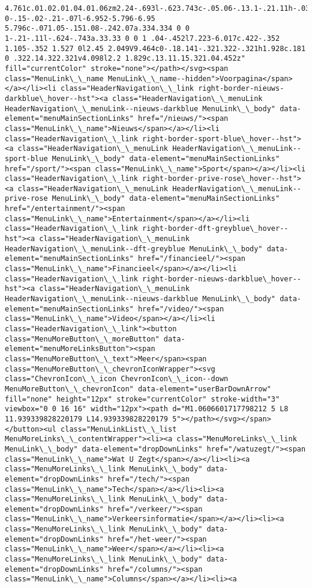 \documentclass[11pt]{article}
\begin{document}
\begin{Verbatim}[commandchars=\\\{\}]
4.761c.01.02.01.04.01.06zm2.24-.693l-.623.743c-.05.06-.13.1-.21.11h-.031c-.08 0-.15-.02-.21-.07l-6.952-5.796-6.95 5.796c-.071.05-.151.08-.242.07a.334.334 0 0 1-.21-.11l-.624-.743a.33.33 0 0 1 .04-.452l7.223-6.017c.422-.352 1.105-.352 1.527 0l2.45 2.049V9.464c0-.18.141-.321.322-.321h1.928c.181 0 .322.14.322.321v4.098l2.2 1.829c.13.11.15.321.04.452z" fill="currentColor" stroke="none"></path></svg><span class="MenuLink\_\_name MenuLink\_\_name--hidden">Voorpagina</span></a></li><li class="HeaderNavigation\_\_link right-border-nieuws-darkblue\_hover--hst"><a class="HeaderNavigation\_\_menuLink HeaderNavigation\_\_menuLink--nieuws-darkblue MenuLink\_\_body" data-element="menuMainSectionLinks" href="/nieuws/"><span class="MenuLink\_\_name">Nieuws</span></a></li><li class="HeaderNavigation\_\_link right-border-sport-blue\_hover--hst"><a class="HeaderNavigation\_\_menuLink HeaderNavigation\_\_menuLink--sport-blue MenuLink\_\_body" data-element="menuMainSectionLinks" href="/sport/"><span class="MenuLink\_\_name">Sport</span></a></li><li class="HeaderNavigation\_\_link right-border-prive-rose\_hover--hst"><a class="HeaderNavigation\_\_menuLink HeaderNavigation\_\_menuLink--prive-rose MenuLink\_\_body" data-element="menuMainSectionLinks" href="/entertainment/"><span class="MenuLink\_\_name">Entertainment</span></a></li><li class="HeaderNavigation\_\_link right-border-dft-greyblue\_hover--hst"><a class="HeaderNavigation\_\_menuLink HeaderNavigation\_\_menuLink--dft-greyblue MenuLink\_\_body" data-element="menuMainSectionLinks" href="/financieel/"><span class="MenuLink\_\_name">Financieel</span></a></li><li class="HeaderNavigation\_\_link right-border-nieuws-darkblue\_hover--hst"><a class="HeaderNavigation\_\_menuLink HeaderNavigation\_\_menuLink--nieuws-darkblue MenuLink\_\_body" data-element="menuMainSectionLinks" href="/video/"><span class="MenuLink\_\_name">Video</span></a></li><li class="HeaderNavigation\_\_link"><button class="MenuMoreButton\_\_moreButton" data-element="menuMoreLinksButton"><span class="MenuMoreButton\_\_text">Meer</span><span class="MenuMoreButton\_\_chevronIconWrapper"><svg class="ChevronIcon\_\_icon ChevronIcon\_\_icon--down MenuMoreButton\_\_chevronIcon" data-element="userBarDownArrow" fill="none" height="12px" stroke="currentColor" stroke-width="3" viewbox="0 0 16 16" width="12px"><path d="M1.0606601717798212 5 L8 11.939339828220179 L14.939339828220179 5"></path></svg></span></button><ul class="MenuLinkList\_\_list MenuMoreLinks\_\_contentWrapper"><li><a class="MenuMoreLinks\_\_link MenuLink\_\_body" data-element="dropDownLinks" href="/watuzegt/"><span class="MenuLink\_\_name">Wat U Zegt</span></a></li><li><a class="MenuMoreLinks\_\_link MenuLink\_\_body" data-element="dropDownLinks" href="/tech/"><span class="MenuLink\_\_name">Tech</span></a></li><li><a class="MenuMoreLinks\_\_link MenuLink\_\_body" data-element="dropDownLinks" href="/verkeer/"><span class="MenuLink\_\_name">Verkeersinformatie</span></a></li><li><a class="MenuMoreLinks\_\_link MenuLink\_\_body" data-element="dropDownLinks" href="/het-weer/"><span class="MenuLink\_\_name">Weer</span></a></li><li><a class="MenuMoreLinks\_\_link MenuLink\_\_body" data-element="dropDownLinks" href="/columns/"><span class="MenuLink\_\_name">Columns</span></a></li><li><a 
\end{Verbatim}
\end{document}
